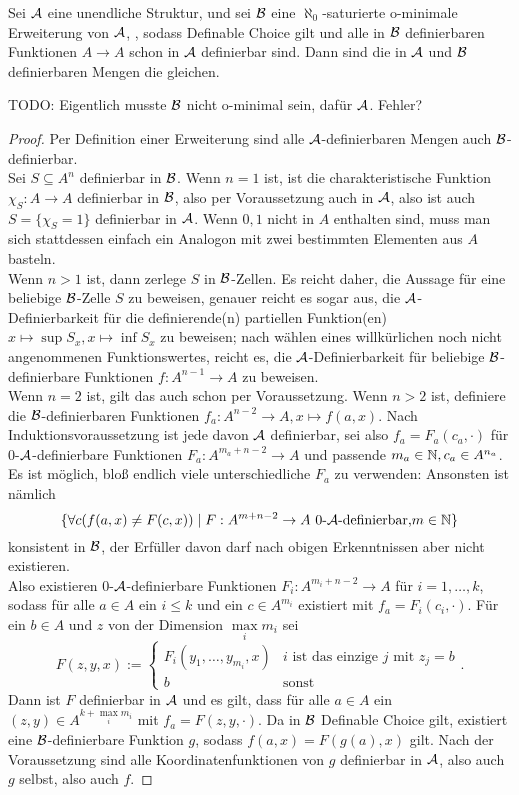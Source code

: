\begin{lemma}\label{Erweiterung definierbare Mengen}
	Sei $\mathcal{A}$ eine unendliche Struktur, und sei $\mathcal{B}$ eine $\aleph_0$-saturierte o-minimale Erweiterung von $\mathcal{A}$, , sodass Definable Choice gilt und alle in $\mathcal{B}$ definierbaren Funktionen $A\rightarrow A$ schon in $\mathcal{A}$ definierbar sind. Dann sind die in $\mathcal{A}$ und $\mathcal{B}$ definierbaren Mengen die gleichen.
\end{lemma}
TODO: Eigentlich musste $\mathcal{B}$ nicht o-minimal sein, dafür $\mathcal{A}$. Fehler?
\begin{proof}
	Per Definition einer Erweiterung sind alle $\mathcal{A}$-definierbaren Mengen auch $\mathcal{B}$-definierbar.\\
	Sei $S\subseteq A^n$ definierbar in $\mathcal{B}$. Wenn $n=1$ ist, ist die charakteristische Funktion $\chi_S:A\rightarrow A$ definierbar in $\mathcal{B}$, also per Voraussetzung auch in $\mathcal{A}$, also ist auch $S=\{\chi_S=1\}$ definierbar in $\mathcal{A}$. Wenn $0,1$ nicht in $A$ enthalten sind, muss man sich stattdessen einfach ein Analogon mit zwei bestimmten Elementen aus $A$ basteln.\\
	Wenn $n>1$ ist, dann zerlege $S$ in $\mathcal{B}$-Zellen. Es reicht daher, die Aussage für eine beliebige $\mathcal{B}$-Zelle $S$ zu beweisen, genauer reicht es sogar aus, die $\mathcal{A}$-Definierbarkeit für die definierende(n) partiellen Funktion(en) $x\mapsto\sup S_x,x\mapsto\inf S_x$ zu beweisen; nach wählen eines willkürlichen noch nicht angenommenen Funktionswertes, reicht es, die $\mathcal{A}$-Definierbarkeit für beliebige $\mathcal{B}$-definierbare Funktionen $f:A^{n-1}\rightarrow A$ zu beweisen.\\
	Wenn $n=2$ ist, gilt das auch schon per Voraussetzung. Wenn $n>2$ ist, definiere die $\mathcal{B}$-definierbaren Funktionen $f_a:A^{n-2}\rightarrow A,x\mapsto f(a,x)$. Nach Induktionsvoraussetzung ist jede davon $\mathcal{A}$ definierbar, sei also $f_a=F_a(c_a,\cdot)$ für 0-$\mathcal{A}$-definierbare Funktionen $F_a:A^{m_a+n-2}\rightarrow A$ und passende $m_a\in\mathbb{N},c_a\in A^{n_a}$. Es ist möglich, bloß endlich viele unterschiedliche $F_a$ zu verwenden: Ansonsten ist nämlich $$\{\forall c(f(a,x)\neq F(c,x))\mid F:A^{m+n-2}\rightarrow A\ \text{0-}\fA\text{-definierbar,}m\in\setN\}$$ konsistent in $\mathcal{B}$, der Erfüller davon darf nach obigen Erkenntnissen aber nicht existieren.\\
	Also existieren 0-$\mathcal{A}$-definierbare Funktionen $F_i:A^{m_i+n-2}\rightarrow A$ für $i=1,\dots,k$, sodass für alle $a\in A$ ein $i\leq k$ und ein $c\in A^{m_i}$ existiert mit $f_a=F_i(c_i,\cdot)$. Für ein $b\in A$ und $z$ von der Dimension $\max\limits_i m_i$ sei
	$$F(z,y,x):=\left\{\begin{array}{ll}
	F_i(y_1,\dots,y_{m_i},x)&i\text{ ist das einzige }j\text{ mit }z_j=b\\
	b&\text{sonst}
	\end{array}\right..$$
	Dann ist $F$ definierbar in $\mathcal{A}$ und es gilt, dass für alle $a\in A$ ein $(z,y)\in A^{k+\max\limits_i m_i}$ mit $f_a=F(z,y,\cdot)$. Da in $\mathcal{B}$ Definable Choice gilt, existiert eine $\mathcal{B}$-definierbare Funktion $g$, sodass $f(a,x)=F(g(a),x)$ gilt. Nach der Voraussetzung sind alle Koordinatenfunktionen von $g$ definierbar in $\mathcal{A}$, also auch $g$ selbst, also auch $f$.
\end{proof}

